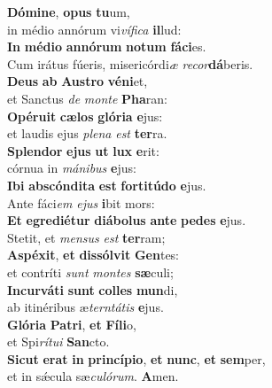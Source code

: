\evenverse \textbf{Dó}\textbf{mi}\textbf{ne}, \textbf{o}\textbf{pus} \textbf{tu}um,~\*\\
\evenverse in médio annórum vi\textit{ví}\textit{fi}\textit{ca} \textbf{il}lud:\\
\oddverse \textbf{In} \textbf{mé}\textbf{di}\textbf{o} \textbf{an}\textbf{nó}\textbf{rum} \textbf{no}\textbf{tum} \textbf{fá}\textbf{ci}es.~\*\\
\oddverse Cum irátus fúeris, misericórdi\textit{æ} \textit{re}\textit{cor}\textbf{dá}beris.\\
\evenverse \textbf{De}\textbf{us} \textbf{ab} \textbf{Au}\textbf{stro} \textbf{vé}\textbf{ni}et,~\*\\
\evenverse et Sanctus \textit{de} \textit{mon}\textit{te} \textbf{Pha}ran:\\
\oddverse \textbf{O}\textbf{pé}\textbf{ru}\textbf{it} \textbf{cæ}\textbf{los} \textbf{gló}\textbf{ri}\textbf{a} \textbf{e}jus:~\*\\
\oddverse et laudis ejus \textit{ple}\textit{na} \textit{est} \textbf{ter}ra.\\
\evenverse \textbf{Splen}\textbf{dor} \textbf{e}\textbf{jus} \textbf{ut} \textbf{lux} \textbf{e}rit:~\*\\
\evenverse córnua in \textit{má}\textit{ni}\textit{bus} \textbf{e}jus:\\
\oddverse \textbf{I}\textbf{bi} \textbf{ab}\textbf{scón}\textbf{di}\textbf{ta} \textbf{est} \textbf{for}\textbf{ti}\textbf{tú}\textbf{do} \textbf{e}jus.~\*\\
\oddverse Ante fáci\textit{em} \textit{e}\textit{jus} \textbf{i}bit mors:\\
\evenverse \textbf{Et} \textbf{e}\textbf{gre}\textbf{di}\textbf{é}\textbf{tur} \textbf{di}\textbf{á}\textbf{bo}\textbf{lus} \textbf{an}\textbf{te} \textbf{pe}\textbf{des} \textbf{e}jus.~\*\\
\evenverse Stetit, et \textit{men}\textit{sus} \textit{est} \textbf{ter}ram;\\
\oddverse \textbf{A}\textbf{spé}\textbf{xit}, \textbf{et} \textbf{dis}\textbf{sól}\textbf{vit} \textbf{Gen}tes:~\*\\
\oddverse et contríti \textit{sunt} \textit{mon}\textit{tes} \textbf{sæ}culi;\\
\evenverse \textbf{In}\textbf{cur}\textbf{vá}\textbf{ti} \textbf{sunt} \textbf{col}\textbf{les} \textbf{mun}di,~\*\\
\evenverse ab itinéribus æ\textit{ter}\textit{ntá}\textit{tis} \textbf{e}jus.\\
\oddverse \textbf{Gló}\textbf{ri}\textbf{a} \textbf{Pa}\textbf{tri}, \textbf{et} \textbf{Fí}\textbf{li}o,~\*\\
\oddverse et Spi\textit{rí}\textit{tu}\textit{i} \textbf{San}cto.\\
\evenverse \textbf{Si}\textbf{cut} \textbf{e}\textbf{rat} \textbf{in} \textbf{prin}\textbf{cí}\textbf{pi}\textbf{o}, \textbf{et} \textbf{nunc}, \textbf{et} \textbf{sem}per,~\*\\
\evenverse et in sǽcula sæ\textit{cu}\textit{ló}\textit{rum}. \textbf{A}men.\\
